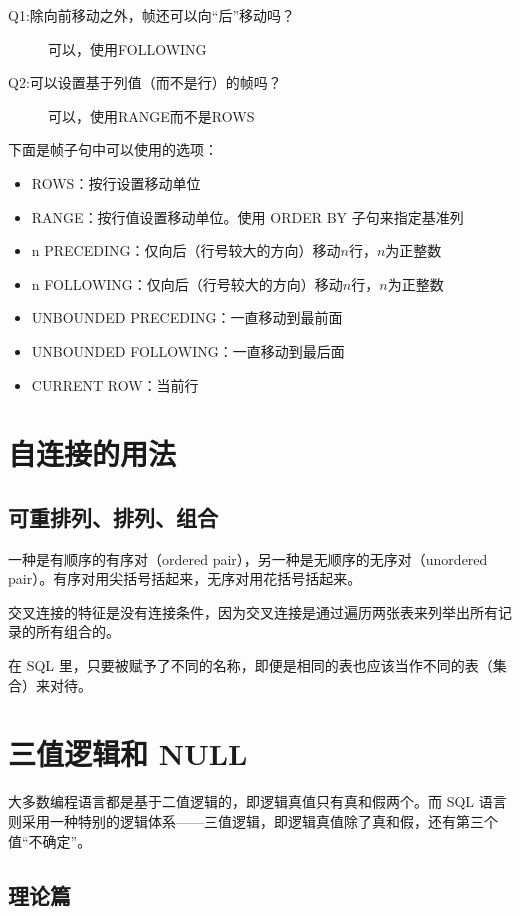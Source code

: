 
\begin{description}
    \item[Q1:除向前移动之外，帧还可以向“后”移动吗？] 可以，使用\textsf{FOLLOWING}
    \item[Q2:可以设置基于列值（而不是行）的帧吗？] 可以，使用\textsf{RANGE}而不是\textsf{ROWS}
\end{description}

下面是帧子句中可以使用的选项：
\begin{itemize}
    \item \textsf{ROWS}：按行设置移动单位
    \item \textsf{RANGE}：按行值设置移动单位。使用 ORDER BY 子句来指定基准列
    \item \textsf{n PRECEDING}：仅向后（行号较大的方向）移动$n$行，$n$为正整数
    \item \textsf{n FOLLOWING}：仅向后（行号较大的方向）移动$n$行，$n$为正整数
    \item \textsf{UNBOUNDED PRECEDING}：一直移动到最前面
    \item \textsf{UNBOUNDED FOLLOWING}：一直移动到最后面
    \item \textsf{CURRENT ROW}：当前行
\end{itemize}

\section{自连接的用法}
\subsection{可重排列、排列、组合}
一种是有顺序的有序对（ordered pair），另一种是无顺序的无序对（unordered pair）。有序对用尖括号括起来，无序对用花括号括起来。

交叉连接的特征是没有连接条件，因为交叉连接是通过遍历两张表来列举出所有记录的所有组合的。

在 SQL 里，只要被赋予了不同的名称，即便是相同的表也应该当作不同的表（集合）来对待。

\section{三值逻辑和 NULL}
大多数编程语言都是基于二值逻辑的，即逻辑真值只有真和假两个。而 SQL 语言则采用一种特别的逻辑体系——三值逻辑，即逻辑真值除了真和假，还有第三个值“不确定”。

\subsection{理论篇}
